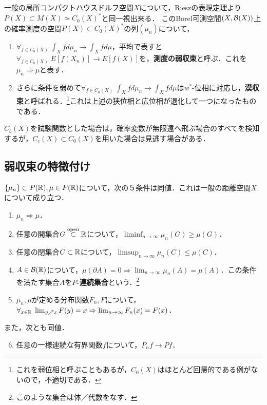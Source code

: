 \documentclass[uplatex,dvipdfmx]{jsreport}
\begin{document}
\begin{definition}
    一般の局所コンパクトハウスドルフ空間$X$について，Rieszの表現定理より$P(X)\subset M(X)\simeq C_0(X)^*$と同一視出来る．
    このBorel可測空間$(X,\mathcal{B}(X))$上の確率測度の空間$P(X)\subset C_0(X)^*$の列$(\mu_n)$について，
    \begin{enumerate}
        \item $\forall_{f\in C_b(X)}\;\int_Xfd\mu_n\to\int_Xfd\mu$，平均で表すと$\forall_{f\in C_b(X)}\;E[f(X_n)]\to E[f(X)]$を，\textbf{測度の弱収束}と呼ぶ．これを$\mu_n\Rightarrow\mu$と表す．
        \item さらに条件を弱めて$\forall_{f\in C_0(X)}\;\int_Xfd\mu_n\to\int_Xfd\mu$は$w^*$-位相に対応し，\textbf{漠収束}と呼ばれる．\footnote{これを弱位相と呼ぶこともあるが，$C_0(X)$はほとんど回帰的である例がないので，不適切である．}これは上述の狭位相と広位相が退化して一つになったものである．
    \end{enumerate}
\end{definition}
\begin{remarks}
    $C_b(X)$を試験関数とした場合は，確率変数が無限遠へ飛ぶ場合のすべてを検知するが，$C_c(X)\subset C_0(X)$を用いた場合は見逃す場合がある．
\end{remarks}

\subsection{弱収束の特徴付け}

\begin{theorem}\label{thm-Portmanteau}
    $\{\mu_n\}\subset P(\mathbb{R}),\mu\in P(\mathbb{R})$について，次の５条件は同値．これは一般の距離空間$X$について成り立つ．
    \begin{enumerate}
        \item $\mu_n\Rightarrow\mu$．
        \item 任意の開集合$G\overset{\mathrm{open}}{\subset}\mathbb{R}$について，$\liminf_{n\to\infty}\mu_n(G)\ge\mu(G)$．
        \item 任意の閉集合$C\subset\mathbb{R}$について，$\limsup_{n\to\infty}\mu_n(C)\le\mu(C)$．
        \item $A\in\mathcal{B}(\mathbb{R})$について，$\mu(\partial A)=0\Rightarrow\lim_{n\to\infty}\mu_n(A)=\mu(A)$．この条件を満たす集合$A$を\textbf{$P$-連続集合}という．\footnote{このような集合は体／代数をなす．}
        \item $\mu_n,\mu$が定める分布関数$F_n,F$について，$\forall_{x\in\mathbb{R}}\;\lim_{y\nearrow x}F(y)=x\Rightarrow\lim_{n\to\infty}F_n(x)=F(x)$．
    \end{enumerate}
    また，次とも同値．
    \begin{enumerate}\setcounter{enumi}{5}
        \item 任意の一様連続な有界関数$f$について，$P_nf\to Pf$．
    \end{enumerate}
\end{theorem}
\end{document}
